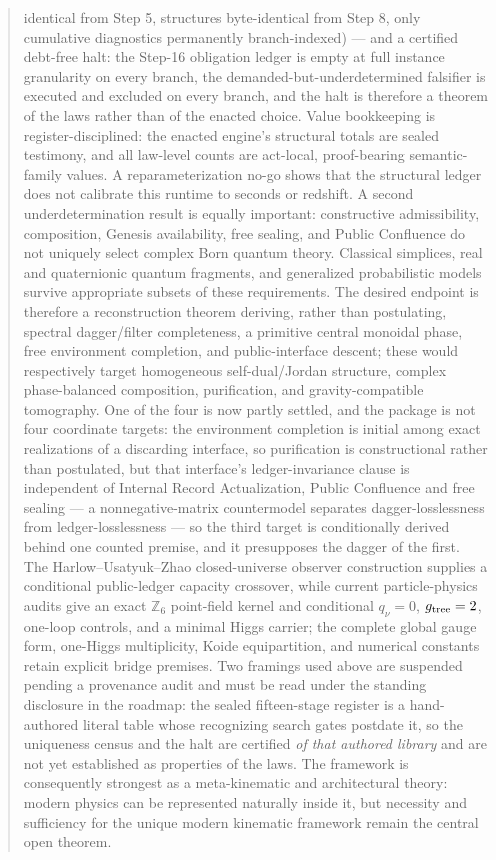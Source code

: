 \documentclass[11pt]{article}
\theoremstyle{plain}
\theoremstyle{definition}
\theoremstyle{remark}
\begin{document}
\begin{abstract}
identical from Step 5, structures byte-identical from Step 8, only cumulative diagnostics permanently branch-indexed) --- and a certified debt-free halt: the Step-16 obligation ledger is empty at full instance granularity on every branch, the demanded-but-underdetermined falsifier is executed and excluded on every branch, and the halt is therefore a theorem of the laws rather than of the enacted choice. Value bookkeeping is register-disciplined: the enacted engine's structural totals are sealed testimony, and all law-level counts are act-local, proof-bearing semantic-family values. A reparameterization no-go shows that the structural ledger does not calibrate this runtime to seconds or redshift. A second underdetermination result is equally important: constructive admissibility, composition, Genesis availability, free sealing, and Public Confluence do not uniquely select complex Born quantum theory. Classical simplices, real and quaternionic quantum fragments, and generalized probabilistic models survive appropriate subsets of these requirements. The desired endpoint is therefore a reconstruction theorem deriving, rather than postulating, spectral dagger/filter completeness, a primitive central monoidal phase, free environment completion, and public-interface descent; these would respectively target homogeneous self-dual/Jordan structure, complex phase-balanced composition, purification, and gravity-compatible tomography. One of the four is now partly settled, and the package is not four coordinate targets: the environment completion is initial among exact realizations of a discarding interface, so purification is constructional rather than postulated, but that interface's ledger-invariance clause is independent of Internal Record Actualization, Public Confluence and free sealing --- a nonnegative-matrix countermodel separates dagger-losslessness from ledger-losslessness --- so the third target is conditionally derived behind one counted premise, and it presupposes the dagger of the first. The Harlow--Usatyuk--Zhao closed-universe observer construction supplies a conditional public-ledger capacity crossover, while current particle-physics audits give an exact \(\mathbb Z_6\) point-field kernel and conditional \(q_\nu=0\), \(g_{\rm tree}=2\), one-loop controls, and a minimal Higgs carrier; the complete global gauge form, one-Higgs multiplicity, Koide equipartition, and numerical constants retain explicit bridge premises. Two framings used above are suspended pending a provenance audit and must be read under the standing disclosure in the roadmap: the sealed fifteen-stage register is a hand-authored literal table whose recognizing search gates postdate it, so the uniqueness census and the halt are certified \emph{of that authored library} and are not yet established as properties of the laws. The framework is consequently strongest as a meta-kinematic and architectural theory: modern physics can be represented naturally inside it, but necessity and sufficiency for the unique modern kinematic framework remain the central open theorem.
\end{abstract}
\end{document}
